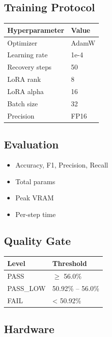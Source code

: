 \subsection{Training Protocol}

\begin{table}[H]
\centering
\small
\begin{tabular}{ll}
\toprule
\textbf{Hyperparameter} & \textbf{Value} \\
\midrule
Optimizer & AdamW \\
Learning rate & 1e-4 \\
Recovery steps & 50 \\
LoRA rank & 8 \\
LoRA alpha & 16 \\
Batch size & 32 \\
Precision & FP16 \\
\bottomrule
\end{tabular}
\end{table}

\subsection{Evaluation}

\begin{itemize}
\item Accuracy, F1, Precision, Recall
\item Total params
\item Peak VRAM
\item Per-step time

\end{itemize}
\subsection{Quality Gate}

\begin{table}[H]
\centering
\small
\begin{tabular}{ll}
\toprule
\textbf{Level} & \textbf{Threshold} \\
\midrule
PASS & $\ge$ 56.0\% \\
PASS\_LOW & 50.92\% -- 56.0\% \\
FAIL & < 50.92\% \\
\bottomrule
\end{tabular}
\end{table}

\subsection{Hardware}


